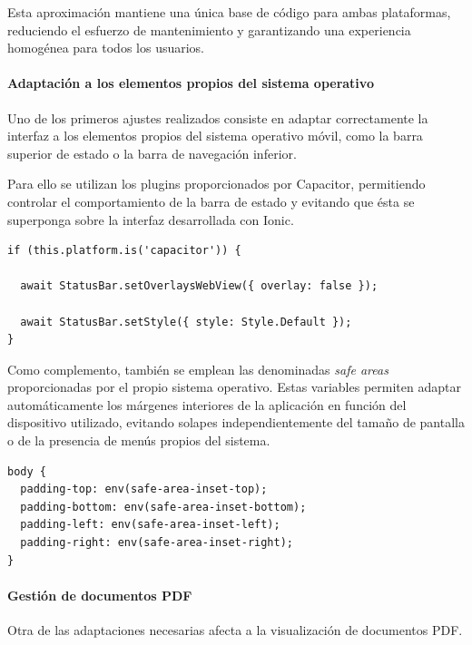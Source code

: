 Esta aproximación mantiene una única base de código para ambas plataformas, reduciendo el esfuerzo de mantenimiento y garantizando una experiencia homogénea para todos los usuarios.

\paragraph{Adaptación a los elementos propios del sistema operativo}

Uno de los primeros ajustes realizados consiste en adaptar correctamente la interfaz a los elementos propios del sistema operativo móvil, como la barra superior de estado o la barra de navegación inferior.

Para ello se utilizan los plugins proporcionados por Capacitor, permitiendo controlar el comportamiento de la barra de estado y evitando que ésta se superponga sobre la interfaz desarrollada con Ionic.

\begin{Verbatim}[frame=single, fontsize=\small, xleftmargin=10pt, xrightmargin=10pt]
if (this.platform.is('capacitor')) {

  await StatusBar.setOverlaysWebView({ overlay: false });

  await StatusBar.setStyle({ style: Style.Default });
}
\end{Verbatim}

Como complemento, también se emplean las denominadas \textit{safe areas} proporcionadas por el propio sistema operativo. Estas variables permiten adaptar automáticamente los márgenes interiores de la aplicación en función del dispositivo utilizado, evitando solapes independientemente del tamaño de pantalla o de la presencia de menús propios del sistema.

\begin{Verbatim}[frame=single, fontsize=\small, xleftmargin=10pt, xrightmargin=10pt]
body {
  padding-top: env(safe-area-inset-top);
  padding-bottom: env(safe-area-inset-bottom);
  padding-left: env(safe-area-inset-left);
  padding-right: env(safe-area-inset-right);
}
\end{Verbatim}

\paragraph{Gestión de documentos PDF}

Otra de las adaptaciones necesarias afecta a la visualización de documentos PDF.

